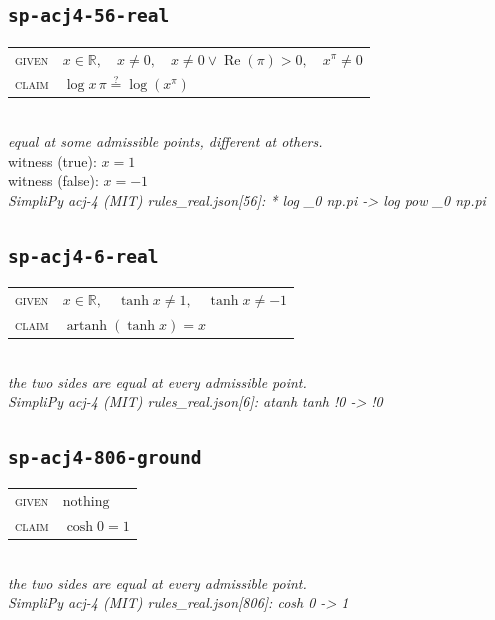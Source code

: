 \documentclass[11pt]{article}
\begin{document}
\subsection*{\texttt{sp-acj4-56-real}}
\begin{tabular}{@{}l@{\quad}l@{}}
\textsc{given} & $x \in \mathbb{R},\quad x \neq 0,\quad x \neq 0 \lor \operatorname{Re}\left(\pi\right) > 0,\quad x^{\pi} \neq 0$ \\[4pt]
\textsc{claim} & $\displaystyle \log x \, \pi \overset{?}{=} \log\left(x^{\pi}\right)$ \\
\end{tabular}\\[2pt]
{\small\emph{equal at some admissible points, different at others.}}\\
{\footnotesize\color{gray}witness (true): $x = 1$}\\
{\footnotesize\color{gray}witness (false): $x = -1$}\\
\emph{SimpliPy acj-4 (MIT) rules\_real.json[56]: * log \_0 np.pi  ->  log pow \_0 np.pi}\\

\subsection*{\texttt{sp-acj4-6-real}}
\begin{tabular}{@{}l@{\quad}l@{}}
\textsc{given} & $x \in \mathbb{R},\quad \tanh x \neq 1,\quad \tanh x \neq -1$ \\[4pt]
\textsc{claim} & $\displaystyle \operatorname{artanh}\left(\tanh x\right) = x$ \\
\end{tabular}\\[2pt]
{\small\emph{the two sides are equal at every admissible point.}}\\
\emph{SimpliPy acj-4 (MIT) rules\_real.json[6]: atanh tanh !0  ->  !0}\\

\subsection*{\texttt{sp-acj4-806-ground}}
\begin{tabular}{@{}l@{\quad}l@{}}
\textsc{given} & $\text{nothing}$ \\[4pt]
\textsc{claim} & $\displaystyle \cosh 0 = 1$ \\
\end{tabular}\\[2pt]
{\small\emph{the two sides are equal at every admissible point.}}\\
\emph{SimpliPy acj-4 (MIT) rules\_real.json[806]: cosh 0  ->  1}\\
\end{document}

